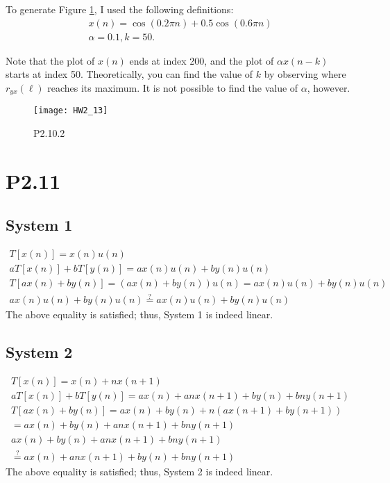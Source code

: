 \documentclass{article}
\begin{document}
To generate Figure \ref{P2.10.2}, I used the
following definitions:
\begin{gather*}
    x(n) = \cos(0.2 \pi n) + 0.5\cos(0.6 \pi n)\\
    \alpha = 0.1, k = 50.
\end{gather*}

Note that the plot of \(x(n)\) ends at index 200, and the plot
of \(\alpha x(n-k)\) starts at index 50. Theoretically, you can
find the value of \(k\) by observing where \(r_{yx}(\ell)\)
reaches its maximum. It is not possible to find the value of
\(\alpha\), however.

\begin{figure}[H]
    \centering
    \texttt{[image: HW2\_13]}
    \caption{P2.10.2}
    \label{P2.10.2}
\end{figure}

\section*{P2.11}

\subsection*{System 1}
\begin{gather*}
    T[x(n)] = x(n)u(n)\\
    aT[x(n)] + bT[y(n)]=ax(n)u(n) + by(n)u(n)\\
    T[ax(n) + by(n)] = (ax(n) + by(n))u(n)
    = ax(n)u(n) + by(n)u(n)\\
    ax(n)u(n) + by(n)u(n) \overset{?}{=} ax(n)u(n) + by(n)u(n)
\end{gather*} The above equality is satisfied; thus, System 1
is indeed linear.

\subsection*{System 2}
\begin{gather*}
    T[x(n)] = x(n) + nx(n+1)\\
    aT[x(n)] + bT[y(n)] = ax(n) + anx(n+1) + by(n) + bny(n+1)\\
    T[ax(n) + by(n)] = ax(n) + by(n) + n(ax(n+1) + by(n+1))
    \\= ax(n) + by(n) + anx(n+1) + bny(n+1)\\
    ax(n) + by(n) + anx(n+1) + bny(n+1) \\ \overset{?}{=}
    ax(n) + anx(n+1) + by(n) + bny(n+1)
\end{gather*} The above equality is satisfied; thus, System 2
is indeed linear.
\end{document}
